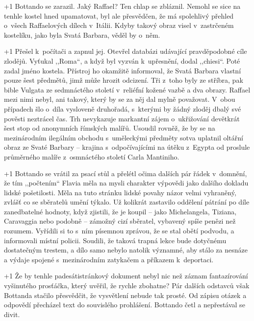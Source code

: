\looseness+1 Bottando se zarazil. Jaký Raffael? Ten chlap se zbláznil. Nemohl se sice na tenhle kostel hned upamatovat, byl ale přesvědčen, že má spolehlivý přehled o~všech Raffaelových dílech v Itálii. Kdyby takový obraz visel v zastrčeném kostelíku, jako byla Svatá Barbara, věděl by o~něm.

\looseness+1 Přešel k počítači a zapnul jej. Otevřel databázi udávající pravděpodobné cíle zlodějů. Vyťukal ,,Roma``, a když byl vyzván k upřesnění, dodal ,,chiesi``. Poté zadal jméno kostela. Přístroj ho okamžitě informoval, že Svatá Barbara vlastní pouze šest předmětů, jimž může hrozit odcizení. Tři z toho byly ze stříbra, pak bible Vulgata ze sedmnáctého století v reliéfní kožené vazbě a dva obrazy. Raffael mezi nimi nebyl, ani takový, který by se za něj dal mylně považovat. V obou případech šlo o~díla vysloveně druhořadá, s kterými by žádný zloděj dbalý své pověsti neztrácel čas. Trh nevykazuje markantní zájem o~ukřižování devětkrát šest stop od anonymních římských malířů. Usoudil rovněž, že by se na mezinárodním ilegálním obchodu s uměleckými předměty sotva uplatnil oltářní obraz ze Svaté Barbary -- krajina s odpočívajícími na útěku z Egypta od proslule průměrného malíře z osmnáctého století Carla Mantiniho.

\looseness+1 Bottando se vrátil za psací stůl a přelétl očima dalších pár řádek v domnění, že tím ,,počtením`` Flavia měla na mysli charakter výpovědi jako dalšího dokladu lidské pošetilosti. Měla na tuto stránku lidské povahy názor velmi vyhraněný, zvlášť co se sběratelů umění týkalo. Už kolikrát zastavilo oddělení pátrání po díle zanedbatelné hodnoty, když zjistili, že je koupil -- jako Michelangela, Tiziana, Caravaggia nebo podobně -- zámožný cizí sběratel, vybavený spíše penězi než rozumem. Vyřídili si to s ním písemnou zprávou, že se stal obětí podvodu, a informovali místní policii. Soudili, že taková trapná lekce bude dotyčnému dostatečným trestem, a dílo samo nebylo natolik významné, aby stálo za nesnáze a výdaje spojené s mezinárodním zatykačem a příkazem k deportaci.

\looseness+1 Že by tenhle padesátistránkový dokument nebyl nic než záznam fantazírování vyšinutého prosťáčka, který uvěřil, že rychle zbohatne? Pár dalších odstavců však Bottanda stačilo přesvědčit, že vysvětlení nebude tak prosté. Od zápisu otázek a odpovědí přecházel text do souvislého prohlášení. Bottando četl a nepřestával se divit.

